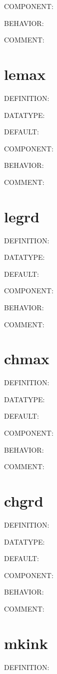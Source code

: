{\color{brown}COMPONENT:}

{\color{purple}BEHAVIOR:}

{\color{olive}COMMENT:}

\section{lemax}
{\color{red}DEFINITION:}

{\color{green}DATATYPE:}

{\color{blue}DEFAULT:}

{\color{brown}COMPONENT:}

{\color{purple}BEHAVIOR:}

{\color{olive}COMMENT:}

\section{legrd}
{\color{red}DEFINITION:}

{\color{green}DATATYPE:}

{\color{blue}DEFAULT:}

{\color{brown}COMPONENT:}

{\color{purple}BEHAVIOR:}

{\color{olive}COMMENT:}

\section{chmax}
{\color{red}DEFINITION:}

{\color{green}DATATYPE:}

{\color{blue}DEFAULT:}

{\color{brown}COMPONENT:}

{\color{purple}BEHAVIOR:}

{\color{olive}COMMENT:}

\section{chgrd}
{\color{red}DEFINITION:}

{\color{green}DATATYPE:}

{\color{blue}DEFAULT:}

{\color{brown}COMPONENT:}

{\color{purple}BEHAVIOR:}

{\color{olive}COMMENT:}

\section{mkink}
{\color{red}DEFINITION:}

